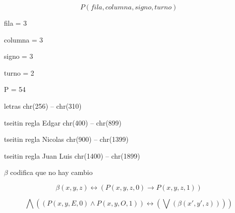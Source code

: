 \documentclass{minimal}
\begin{document}
\[
P(fila, columna, signo, turno)
\]


fila = 3

columna = 3

signo = 3

turno = 2

P = 54

letras chr(256) -- chr(310)

tseitin regla Edgar chr(400) -- chr(899)

tseitin regla Nicolas chr(900) -- chr(1399)

tseitin regla Juan Luis chr(1400) -- chr(1899)


$\beta$ codifica que no hay cambio


\[
\beta(x,y,z) \leftrightarrow ( P(x,y,z,0) \to P(x,y,z,1)  )
\]

\[
\bigwedge\left(   ( P(x,y,E,0) \wedge P(x,y,O,1)  ) \leftrightarrow (\bigvee( \beta(x',y',z)  ) )    \right)
\]
\end{document}
